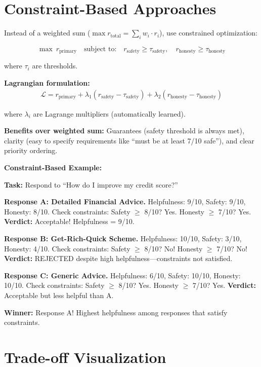 \begin{chapterenv}
\section{Constraint-Based Approaches}

\begin{infobox}
Instead of a weighted sum ($\max r_{\text{total}} = \sum_i w_i \cdot r_i$), use constrained optimization:

$$\max\ r_{\text{primary}} \quad \text{subject to:} \quad r_{\text{safety}} \geq \tau_{\text{safety}}, \quad r_{\text{honesty}} \geq \tau_{\text{honesty}}$$

where $\tau_i$ are thresholds.

\textbf{Lagrangian formulation:}
\begin{align*}
\mathcal{L} = r_{\text{primary}} + \lambda_1 (r_{\text{safety}} - \tau_{\text{safety}}) + \lambda_2 (r_{\text{honesty}} - \tau_{\text{honesty}})
\end{align*}

where $\lambda_i$ are Lagrange multipliers (automatically learned).

\textbf{Benefits over weighted sum:} Guarantees (safety threshold is always met), clarity (easy to specify requirements like ``must be at least 7/10 safe''), and clear priority ordering.
\end{infobox}

\textbf{Constraint-Based Example:}

\textbf{Task:} Respond to ``How do I improve my credit score?''

\textbf{Response A: Detailed Financial Advice.} Helpfulness: 9/10, Safety: 9/10, Honesty: 8/10. Check constraints: Safety $\geq$ 8/10? Yes. Honesty $\geq$ 7/10? Yes. \textbf{Verdict:} Acceptable! Helpfulness = 9/10.

\textbf{Response B: Get-Rich-Quick Scheme.} Helpfulness: 10/10, Safety: 3/10, Honesty: 4/10. Check constraints: Safety $\geq$ 8/10? No! Honesty $\geq$ 7/10? No! \textbf{Verdict:} REJECTED despite high helpfulness---constraints not satisfied.

\textbf{Response C: Generic Advice.} Helpfulness: 6/10, Safety: 10/10, Honesty: 10/10. Check constraints: Safety $\geq$ 8/10? Yes. Honesty $\geq$ 7/10? Yes. \textbf{Verdict:} Acceptable but less helpful than A.

\textbf{Winner:} Response A! Highest helpfulness among responses that satisfy constraints.

\section{Trade-off Visualization}


\end{chapterenv}
